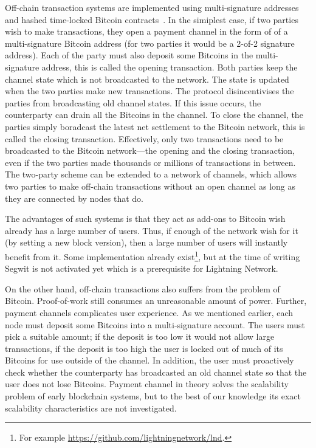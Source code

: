 Off-chain transaction systems are implemented using multi-signature addresses~\cite{bitcoinmultisig} and hashed time-locked Bitcoin contracts~\cite{bitcointimelock}.
In the simiplest case, 
if two parties wish to make transactions,
they open a payment channel in the form of of a multi-signature Bitcoin address (for two parties it would be a 2-of-2 signature address).
Each of the party must also deposit some Bitcoins in the multi-signature address,
this is called the opening transaction.
Both parties keep the channel state which is not broadcasted to the network.
The state is updated when the two parties make new transactions.
The protocol disincentivises the parties from broadcasting old channel states.
If this issue occurs, the counterparty can drain all the Bitcoins in the channel.
To close the channel, the parties simply boradcast the latest net settlement to the Bitcoin network,
this is called the closing transaction.
Effectively, only two transactions need to be broadcasted to the Bitcoin network---the opening and the closing transaction,
even if the two parties made thousands or millions of transactions in between.
The two-party scheme can be extended to a network of channels,
which allows two parties to make off-chain transactions without an open channel as long as they are connected by nodes that do.

The advantages of such systems is that they act as add-ons to Bitcoin wish already has a large number of users.
Thus, if enough of the network wish for it (by setting a new block version),
then a large number of users will instantly benefit from it.
Some implementation already exist\footnote{For example \url{https://github.com/lightningnetwork/lnd}.},
but at the time of writing Segwit is not activated yet which is a prerequisite for Lightning Network.

On the other hand, off-chain transactions also suffers from the problem of Bitcoin.
Proof-of-work still consumes an unreasonable amount of power.
Further, payment channels complicates user experience.
As we mentioned earlier, each node must deposit some Bitcoins into a multi-signature account.
The users must pick a suitable amount;
if the deposit is too low it would not allow large transactions,
if the deposit is too high the user is locked out of much of its Bitcoins for use outside of the channel.
In addition, the user must proactively check whether the counterparty has broadcasted an old channel state so that the user does not lose Bitcoins.
Payment channel in theory solves the scalability problem of early blockchain systems,
but to the best of our knowledge its exact scalability characteristics are not investigated.

